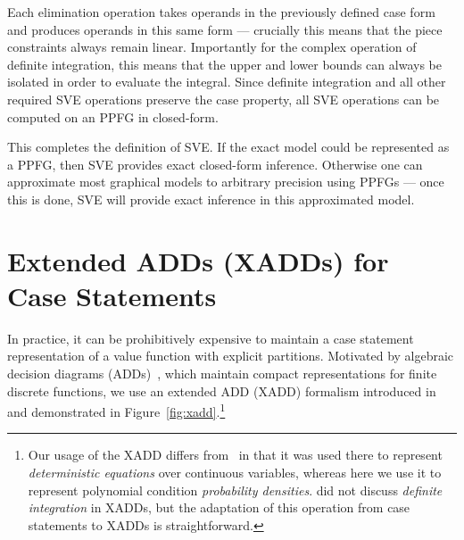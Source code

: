 \documentclass[letterpaper]{article}
\renewcommand{\-}{\text{-}}
\begin{document}
{Each elimination operation takes operands in the previously defined
case form and produces operands in this same form --- crucially this means
that the piece constraints always remain linear.  Importantly for the
complex operation of definite integration, this means that the upper
and lower bounds can always be isolated in order to evaluate the
integral.  Since definite integration and all other
required SVE operations preserve the case property, 
all SVE operations can be computed on an PPFG in closed-form.

This completes the definition of SVE.  If the exact model could be
represented as a PPFG, then SVE provides exact closed-form inference.
Otherwise one can approximate most graphical models to arbitrary
precision using PPFGs --- once this is done, SVE will provide exact
inference in this approximated model.


\section{Extended ADDs (XADDs) for Case Statements}

In practice, it can be prohibitively expensive to maintain a case
statement representation of a value function with explicit partitions.
Motivated by algebraic decision diagrams (ADDs)~\cite{bahar93add},
which maintain compact representations for finite discrete functions,
we use an extended ADD (XADD) formalism introduced 
in~\cite{uai11} and demonstrated in 
Figure~\ref{fig:xadd}.\footnote{Our usage of the XADD differs
from~\cite{uai11} in that it was used there to represent
\emph{deterministic equations} over continuous variables, whereas
here we use it to represent polynomial condition \emph{probability
densities}.  \cite{uai11} did not discuss \emph{definite integration} in XADDs,
but the adaptation of this operation 
from case statements to XADDs is straightforward.}

}
\end{document}
